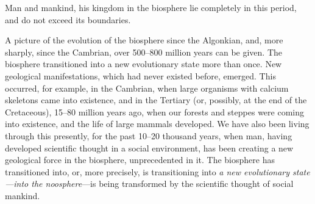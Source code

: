 Man and mankind, his kingdom in the biosphere lie completely in this period,
and do not exceed its boundaries.

A picture of the evolution of the biosphere since the Algonkian, and, more
sharply, since the Cambrian, over 500--800 million years can be given.  The
biosphere transitioned into a new evolutionary state more than once.  New geological manifestations, which had never
existed before, emerged.  This occurred, for example, in the Cambrian, when
large organisms with calcium skeletons came into existence, and in the Tertiary
(or, possibly, at the end of the Cretaceous), 15--80 million years ago, when
our forests and steppes were coming into existence, and the life of large
mammals developed.  We have also been living through this presently, for the
past 10--20 thousand years, when man, having developed scientific thought in a
social environment, has been creating a new geological force in the biosphere,
unprecedented in it.  The biosphere has transitioned into, or, more precisely,
is transitioning into \emph{a new evolutionary state---into the noosphere}---is
being transformed by the scientific thought of social mankind.


